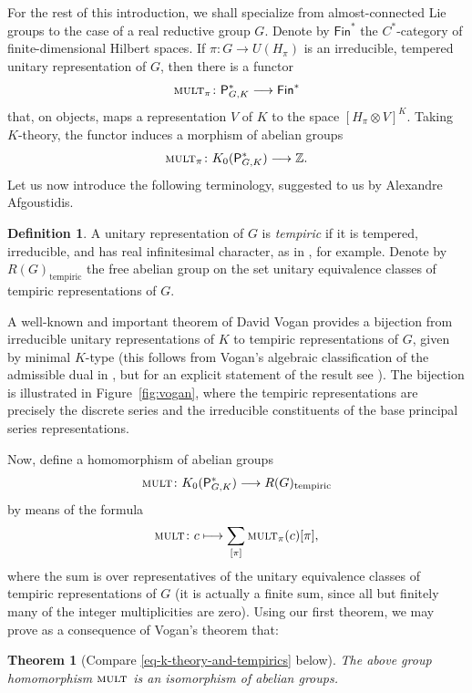 \documentclass[leqno,11pt]{amsart}
\numberwithin{equation}{subsection}
\theoremstyle{plain}
\newtheorem*{theorem*}{Theorem}
\theoremstyle{definition}
\newtheorem*{definition*}{Definition}
\theoremstyle{remark}
\newcommand{\Z}{\mathbb{Z}}
\newcommand{\PSDO}{\mathsf{P}}
\newcommand{\Fin}{\mathsf{Fin}}
\newcommand{\mult}{{\textsc{\textsf{mult}}}}
\begin{document}
For the rest of this introduction, we shall specialize from almost-connected Lie groups to the case of a real reductive group $G$.  Denote by $\Fin^*$ the $C^*$-category of finite-dimensional Hilbert spaces. If $\pi\colon G \to U(H_\pi)$ is an  irreducible, tempered unitary representation of $G$, then there is a functor
\[
\mult_{\pi} \colon \PSDO^*_{G,K} \longrightarrow \Fin^* 
\]
that, on objects, maps a representation $V$ of $K$ to the space 
$ [ H_\pi \otimes V]^K$.
Taking $K$-theory, the functor induces a morphism of abelian groups
\[
\mult_{\pi}\colon K_0( \PSDO^*_{G,K}) \longrightarrow  \Z.
\]
Let us now introduce the following terminology, suggested to us by Alexandre Afgoustidis. 

\begin{definition*}
A unitary representation of $G$ is \emph{tempiric} if it is tempered, irreducible, and has real infinitesimal character, as in \cite{Vogan00}, for example.  Denote by $R(G)_{\mathrm{tempiric}}$ the free abelian group on the set unitary equivalence classes of tempiric representations of $G$.
\end{definition*}


A well-known and important theorem of David Vogan  provides a bijection from irreducible unitary representations of $K$ to tempiric representations of  $G$, given by minimal $K$-type (this follows from Vogan's algebraic classification of the admissible dual in \cite{VoganGreenBook}, but for an explicit statement of the result see \cite[Thm.~1.2]{VoganBranching07}). The bijection is illustrated in Figure~\ref{fig:vogan}, where the tempiric representations are precisely the discrete series and the irreducible constituents of the base principal series representations.  

Now, define a homomorphism of abelian groups 
\[
 \mult\colon K_0(\PSDO^*_{G,K})  \longrightarrow R(G)_{\mathrm{tempiric}}
\]
by means of the formula 
\[
\mult \colon c \longmapsto \sum_{[\pi]} \mult_{\pi}(c)[\pi] ,
\]
where the sum is over representatives of the unitary equivalence classes of tempiric representations of $G$ (it  is actually a finite sum, since all but finitely many of the integer multiplicities are zero).  Using our first theorem,  we may prove as a consequence of Vogan's theorem that:


\begin{theorem*}[Compare  \eqref{eq-k-theory-and-tempirics} below]
 The  above group homomorphism
$
 \mult $
 is an isomorphism of abelian groups.
\end{theorem*}
\end{document}
